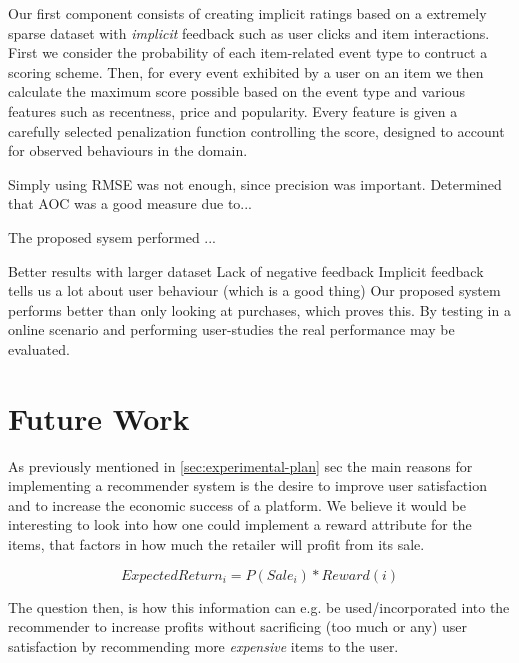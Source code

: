 Our first component consists of creating implicit ratings based on a extremely
sparse dataset with \textit{implicit} feedback such as user clicks and item
interactions. First we consider the probability of each item-related event type
to contruct a scoring scheme. Then, for every event exhibited by a user on an
item we then calculate the maximum score possible based on the event type and
various features such as recentness, price and popularity. Every feature is
given a carefully selected penalization function controlling the score,
designed to account for observed behaviours in the domain.




Simply using RMSE was not enough, since precision was important.
Determined that AOC was a good measure due to...

The proposed sysem performed ...

Better results with larger dataset
Lack of negative feedback
Implicit feedback tells us a lot about user behaviour (which is a good thing)
Our proposed system performs better than only looking at purchases, which
proves this.
By testing in a online scenario and performing user-studies the real
performance may be evaluated.

\clearpage
\section{Future Work}

As previously mentioned in \ref{sec:experimental-plan} sec the main reasons for
implementing a recommender system is the desire to improve user satisfaction
and to increase the economic success of a platform.  We believe it would be
interesting to look into how one could implement a reward attribute for the
items, that factors in how much the retailer will profit from its sale.

\begin{equation}
ExpectedReturn_i = P(Sale_i) * Reward(i)
\end{equation}

The question then, is how this information can e.g. be used/incorporated into
the recommender to increase profits without sacrificing (too much or any) user
satisfaction by recommending more \emph{expensive} items to the user.


